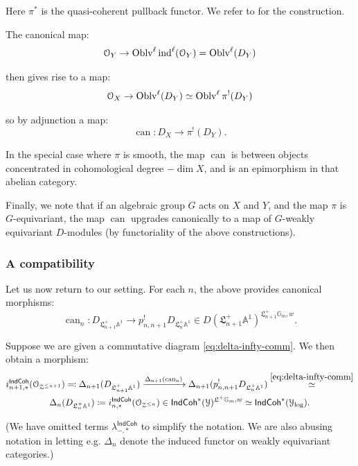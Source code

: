 \documentclass[reqno,11pt]{amsart}
\numberwithin{equation}{subsection}
\theoremstyle{remark}
\newcommand{\xar}[1]{\xrightarrow{#1}}
\newcommand{\bA}{{\mathbb A}}
\newcommand{\bG}{{\mathbb G}}
\newcommand{\sO}{{\EuScript O}}
\newcommand{\sY}{{\EuScript Y}}
\newcommand{\sZ}{{\EuScript Z}}
\newcommand{\fL}{{\mathfrak L}}
\newcommand{\on}{\operatorname}
\newcommand{\ind}{\on{ind}}
\newcommand{\Oblv}{\on{Oblv}}
\newcommand{\IndCoh}{\mathsf{IndCoh}}
\begin{document}
\noindent Here $\pi^*$ is the quasi-coherent pullback functor. We refer
to \cite{crystals} for the construction.

The canonical map:
%
\[
\sO_Y \to \Oblv^{\ell}\ind^{\ell}(\sO_Y) = \Oblv^{\ell}(D_Y)
\]

\noindent then gives rise to a map:
%
\[
\sO_X \to \Oblv^{\ell}(D_Y) \simeq 
\Oblv^{\ell}\pi^!(D_Y)
\]

\noindent so by adjunction a map:
%
\begin{equation}\label{eq:can-x-y}
\on{can}:D_X \to \pi^!(D_Y).
\end{equation}

In the special case where $\pi$ is smooth, the map $\on{can}$
is between objects concentrated in cohomological degree $-\dim X$, and
is an epimorphism in that abelian category.

Finally, we note that if an algebraic group $G$ acts on $X$ and $Y$, and the map
$\pi$ is $G$-equivariant, the map $\on{can}$ upgrades canonically to a map 
of $G$-weakly equivariant $D$-modules (by functoriality of the above constructions).  

\subsubsection{A compatibility}\label{sss:diff-compat}

Let us now return to our setting. For each $n$, the above
provides canonical morphisms:
%
\[
\on{can}_n:
D_{\fL_{n+1}^+ \bA^1} \to p_{n,n+1}^! D_{\fL_n^+ \bA^1} \in 
D(\fL_{n+1}^+ \bA^1)^{\fL_{n+1}^+ \bG_m,w}.
\]

Suppose we are given a commutative diagram \eqref{eq:delta-infty-comm}.
We then obtain a morphism:
%
\begin{equation}\label{eq:delta-can-n}
\begin{gathered}
i_{n+1,*}^{\IndCoh}(\sO_{\sZ^{\leq n+1}}) \eqqcolon 
\Delta_{n+1}(D_{\fL_{n+1}^+ \bA^1}) \xar{\on{\Delta_{n+1}(\on{can}_n)}}
\Delta_{n+1}(p_{n,n+1}^! D_{\fL_n^+ \bA^1}) 
\overset{\eqref{eq:delta-infty-comm}}{\simeq} \\
\Delta_n(D_{\fL_n^+ \bA^1}) 
\coloneqq
i_{n,*}^{\IndCoh}(\sO_{\sZ^{\leq n}}) \in \IndCoh^*(\sY)^{\fL^+\bG_m,w} \simeq 
\IndCoh^*(\sY_{\log}).
\end{gathered}
\end{equation}

\noindent (We have omitted terms $\lambda_{-,*}^{\IndCoh}$ to simplify 
the notation. We are also abusing notation in letting
e.g. $\Delta_n$ denote the induced functor on 
weakly equivariant categories.)
\end{document}
